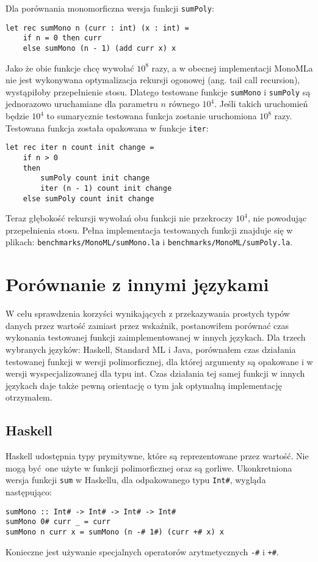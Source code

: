 \documentclass[declaration,shortabstract]{iithesis}
\begin{document}
Dla porównania monomorficzna wersja funkcji \texttt{sumPoly}: 
\begin{lstlisting}[frame=lines]
let rec sumMono n (curr : int) (x : int) = 
    if n = 0 then curr 
    else sumMono (n - 1) (add curr x) x 
\end{lstlisting}

Jako że obie funkcje chcę wywołać $10^8$ razy, a w obecnej implementacji
MonoMLa nie jest wykonywana optymalizacja rekursji ogonowej (ang. tail call 
recursion), wystąpiłoby przepełnienie stosu. Dlatego testowane funkcje 
\texttt{sumMono} i \texttt{sumPoly} są jednorazowo uruchamiane dla parametru 
$n$ równego $10^4$. Jeśli takich uruchomień będzie $10^4$ to sumarycznie
testowana funkcja zostanie uruchomiona $10^8$ razy. Testowana funkcja została 
opakowana w funkcje \texttt{iter}:
\begin{lstlisting}[frame=lines]
let rec iter n count init change = 
    if n > 0
    then 
        sumPoly count init change
        iter (n - 1) count init change
    else sumPoly count init change
\end{lstlisting}
Teraz głębokość rekursji wywołań obu funkcji nie przekroczy $10^4$, nie powodując 
przepełnienia stosu. Pełna implementacja testowanych funkcji znajduje się w plikach:
\texttt{benchmarks/MonoML/sumMono.la} i \texttt{benchmarks/MonoML/sumPoly.la}.

\section{Porównanie z innymi językami}

W celu sprawdzenia korzyści wynikających z przekazywania prostych typów danych 
przez wartość zamiast przez wskaźnik, postanowiłem porównać czas wykonania 
testowanej funkcji zaimplementowanej w innych językach. Dla trzech wybranych 
języków: Haskell, Standard ML i Java, porównałem czas działania testowanej funkcji 
w wersji polimorficznej, dla której argumenty są opakowane i w wersji wyspecjalizowanej 
dla typu int. Czas działania tej samej funkcji w innych językach daje także pewną 
orientację o tym jak optymalną implementację otrzymałem.

\subsection{Haskell}

Haskell udostępnia typy prymitywne, które są reprezentowane przez wartość. Nie 
mogą być one użyte w funkcji polimorficznej oraz są gorliwe. Ukonkretniona 
wersja funkcji \texttt{sum} w Haskellu, dla odpakowanego typu \texttt{Int\#}, 
wygląda następująco:
\begin{lstlisting}[frame=lines]
sumMono :: Int# -> Int# -> Int# -> Int# 
sumMono 0# curr _ = curr 
sumMono n curr x = sumMono (n -# 1#) (curr +# x) x
\end{lstlisting}
Konieczne jest używanie specjalnych operatorów arytmetycznych \texttt{-\#}
i \texttt{+\#}. 
\end{document}
